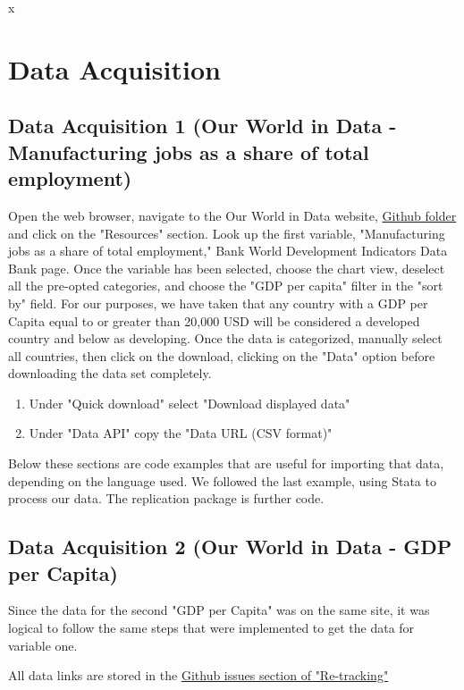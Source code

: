 x\documentclass[12pt]{article}
\begin{document}
\section{Data Acquisition}
\label{sec:theory}


    \subsection{Data Acquisition 1 (Our World in Data - Manufacturing jobs as a share of total employment)}
    
Open the web browser, navigate to the Our World in Data website, \href{https://github.com/ecn310/course-project-development/issues/12}{Github folder} and click on the "Resources" section. Look up the first variable, "Manufacturing jobs as a share of total employment," Bank World Development Indicators Data Bank page. Once the variable has been selected, choose the chart view, deselect all the pre-opted categories, and choose the "GDP per capita" filter in the "sort by" field. For our purposes, we have taken that any country with a GDP per Capita equal to or greater than 20,000 USD will be considered a developed country and below as developing. Once the data is categorized, manually select all countries, then click on the download, clicking on the "Data" option before downloading the data set completely. 
\begin{enumerate}
\item Under "Quick download" select "Download displayed data" 

\item Under "Data API" copy the "Data URL (CSV format)" 

\end{enumerate}

Below these sections are code examples that are useful for importing that data, depending on the language used. We followed the last example, using Stata to process our data. The replication package is further code. 

    \subsection{Data Acquisition 2 (Our World in Data - GDP per Capita)}
Since the data for the second "GDP per Capita" was on the same site, it was logical to follow the same steps that were implemented to get the data for variable one. 

All data links are stored in the \href{https://github.com/ecn310/course-project-development/issues/15#issuecomment-2486305999}{Github issues section of "Re-tracking"} 
\end{document}
